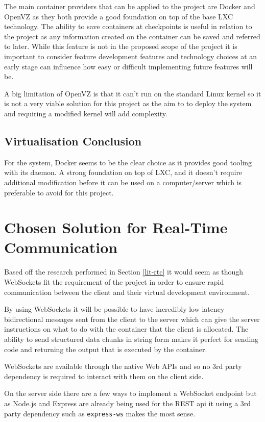 The main container providers that can be applied to the project are Docker and OpenVZ as they both provide a good foundation on top of the base LXC technology. The ability to save containers at checkpoints is useful in relation to the project as any information created on the container can be saved and referred to later. While this feature is not in the proposed scope of the project it is important to consider feature development features and technology choices at an early stage can influence how easy or difficult implementing future features will be.

A big limitation of OpenVZ is that it can't run on the standard Linux kernel so it is not a very viable solution for this project as the aim to to deploy the system and requiring a modified kernel will add complexity.

\subsection{Virtualisation Conclusion}

For the system, Docker seems to be the clear choice as it provides good tooling with its daemon. A strong foundation on top of LXC, and it doesn't require additional modification before it can be used on a computer/server which is preferable to avoid for this project.

\section{Chosen Solution for Real-Time Communication} \label{solapp-rtc}

Based off the research performed in Section \ref{lit-rtc} it would seem as though WebSockets fit the requirement of the project in order to ensure rapid communication between the client and their virtual development environment.

By using WebSockets it will be possible to have incredibly low latency bidirectional messages sent from the client to the server which can give the server instructions on what to do with the container that the client is allocated. The ability to send structured data chunks in string form makes it perfect for sending code and returning the output that is executed by the container.

WebSockets are available through the native Web APIs and so no 3rd party dependency is required to interact with them on the client side.

On the server side there are a few ways to implement a WebSocket endpoint but as Node.js and Express are already being used for the REST api it using a 3rd party dependency such as \texttt{express-ws} makes the most sense.


